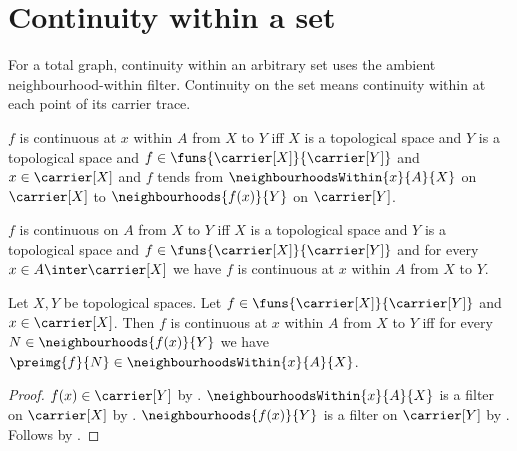 \section{Continuity within a set}





For a total graph, continuity within an arbitrary set uses the ambient
neighbourhood-within filter.  Continuity on the set means continuity within
at each point of its carrier trace.

\begin{definition}\label{continuous_at_within}
    $f$ is continuous at $x$ within $A$ from $X$ to $Y$ iff
        $X$ is a topological space and
        $Y$ is a topological space and
        $f\in\funs{\carrier[X]}{\carrier[Y]}$ and
        $x\in\carrier[X]$ and
        $f$ tends from $\neighbourhoodsWithin{x}{A}{X}$ on
            $\carrier[X]$ to
            $\neighbourhoods{f(x)}{Y}$ on $\carrier[Y]$.
\end{definition}

\begin{definition}\label{continuous_on}
    $f$ is continuous on $A$ from $X$ to $Y$ iff
        $X$ is a topological space and
        $Y$ is a topological space and
        $f\in\funs{\carrier[X]}{\carrier[Y]}$ and
        for every $x\in A\inter\carrier[X]$ we have
        $f$ is continuous at $x$ within $A$ from $X$ to $Y$.
\end{definition}

\begin{theorem}\label{continuous_at_within_iff_preimages}
    Let $X,Y$ be topological spaces.
    Let $f\in\funs{\carrier[X]}{\carrier[Y]}$ and
        $x\in\carrier[X]$.
    Then $f$ is continuous at $x$ within $A$ from $X$ to $Y$ iff
        for every $N\in\neighbourhoods{f(x)}{Y}$ we have
        $\preimg{f}{N}\in\neighbourhoodsWithin{x}{A}{X}$.
\end{theorem}
\begin{proof}
    $f(x)\in\carrier[Y]$ by .
    $\neighbourhoodsWithin{x}{A}{X}$ is a filter on $\carrier[X]$ by
        .
    $\neighbourhoods{f(x)}{Y}$ is a filter on $\carrier[Y]$ by
        .
    Follows by .
\end{proof}

